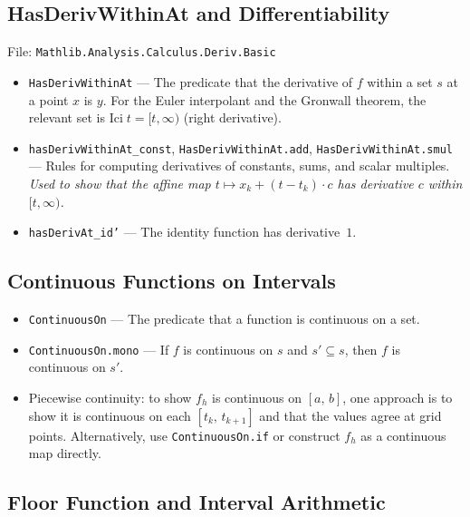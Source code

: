 \documentclass[11pt,a4paper]{article}
\theoremstyle{definition}
\newcommand{\Icc}[2]{[#1,\, #2]}
\begin{document}
\subsection{HasDerivWithinAt and Differentiability}
\label{ssec:deriv}

File: \texttt{Mathlib.Analysis.Calculus.Deriv.Basic}

\begin{itemize}
  \item \texttt{HasDerivWithinAt} ---
    The predicate that the derivative of $f$ within a set $s$ at
    a point $x$ is $y$. For the Euler interpolant and the Gronwall
    theorem, the relevant set is $\mathrm{Ici}\;t = [t, \infty)$
    (right derivative).

  \item \texttt{hasDerivWithinAt\_const}, \texttt{HasDerivWithinAt.add},
    \texttt{HasDerivWithinAt.smul} ---
    Rules for computing derivatives of constants, sums, and scalar
    multiples. \emph{Used to show that the affine map
    $t \mapsto x_k + (t - t_k) \cdot c$ has derivative $c$
    within $[t, \infty)$.}

  \item \texttt{hasDerivAt\_id'} --- The identity function has
    derivative~$1$.
\end{itemize}


\subsection{Continuous Functions on Intervals}
\label{ssec:continuous}

\begin{itemize}
  \item \texttt{ContinuousOn} --- The predicate that a function
    is continuous on a set.

  \item \texttt{ContinuousOn.mono} --- If $f$ is continuous on $s$
    and $s' \subseteq s$, then $f$ is continuous on $s'$.

  \item Piecewise continuity: to show $f_h$ is continuous on
    $\Icc{a}{b}$, one approach is to show it is continuous on
    each $\Icc{t_k}{t_{k+1}}$ and that the values agree at
    grid points. Alternatively, use
    \texttt{ContinuousOn.if} or construct $f_h$ as a
    continuous map directly.
\end{itemize}


\subsection{Floor Function and Interval Arithmetic}
\label{ssec:floor}
\end{document}
